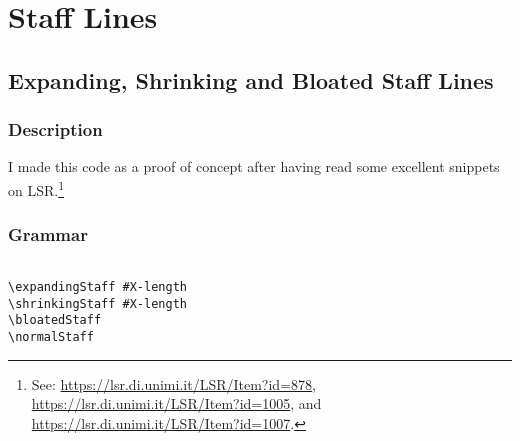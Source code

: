 
\chapter {Staff Lines}


\section {Expanding, Shrinking and Bloated Staff Lines}
\hfill

\subsection{Description}
I made this code as a proof of concept after having read some excellent snippets on LSR.\footnote{See: \url{https://lsr.di.unimi.it/LSR/Item?id=878}, \url{https://lsr.di.unimi.it/LSR/Item?id=1005}, and \url{https://lsr.di.unimi.it/LSR/Item?id=1007}. }

\subsection{Grammar}
\begin{verbatim}

\expandingStaff #X-length
\shrinkingStaff #X-length
\bloatedStaff
\normalStaff

\end{verbatim}
